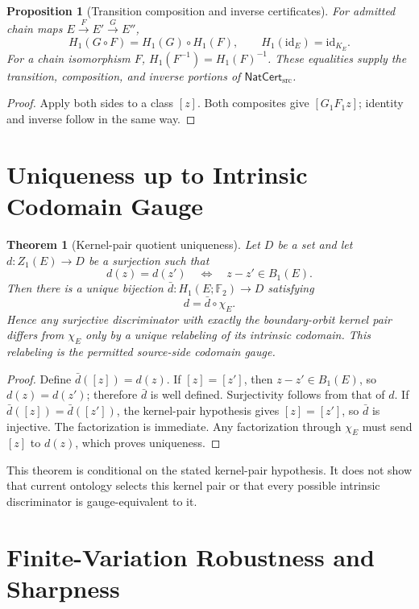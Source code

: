 \documentclass[11pt]{article}
\newtheorem{theorem}{Theorem}
\newtheorem{proposition}{Proposition}
\newcommand{\Ftwo}{\mathbb F_2}
\newcommand{\NatCert}{\mathsf{NatCert}_{\mathrm{src}}}
\begin{document}
\begin{proposition}[Transition composition and inverse certificates]
For admitted chain maps \(E\xrightarrow{F}E'\xrightarrow{G}E''\),
\[
 H_1(G\circ F)=H_1(G)\circ H_1(F),\qquad H_1(\mathrm{id}_E)=\mathrm{id}_{K_E}.
\]
For a chain isomorphism \(F\),
\(H_1(F^{-1})=H_1(F)^{-1}\). These equalities supply the transition,
composition, and inverse portions of \(\NatCert\).
\end{proposition}

\begin{proof}
Apply both sides to a class \([z]\). Both composites give
\([G_1F_1z]\); identity and inverse follow in the same way.
\end{proof}

\section{Uniqueness up to Intrinsic Codomain Gauge}

\begin{theorem}[Kernel-pair quotient uniqueness]
Let \(D\) be a set and let \(d:Z_1(E)\to D\) be a surjection such that
\[
 d(z)=d(z')\quad\Longleftrightarrow\quad z-z'\in B_1(E).
\]
Then there is a unique bijection
\(\bar d:H_1(E;\Ftwo)\to D\) satisfying
\[
 d=\bar d\circ\chi_E.
\]
Hence any surjective discriminator with exactly the boundary-orbit kernel
pair differs from \(\chi_E\) only by a unique relabeling of its intrinsic
codomain. This relabeling is the permitted source-side codomain gauge.
\end{theorem}

\begin{proof}
Define \(\bar d([z])=d(z)\). If \([z]=[z']\), then
\(z-z'\in B_1(E)\), so \(d(z)=d(z')\); therefore \(\bar d\) is well
defined. Surjectivity follows from that of \(d\). If
\(\bar d([z])=\bar d([z'])\), the kernel-pair hypothesis gives
\([z]=[z']\), so \(\bar d\) is injective. The factorization is immediate.
Any factorization through \(\chi_E\) must send \([z]\) to \(d(z)\), which
proves uniqueness.
\end{proof}

This theorem is conditional on the stated kernel-pair hypothesis. It does not
show that current ontology selects this kernel pair or that every possible
intrinsic discriminator is gauge-equivalent to it.

\section{Finite-Variation Robustness and Sharpness}
\end{document}
